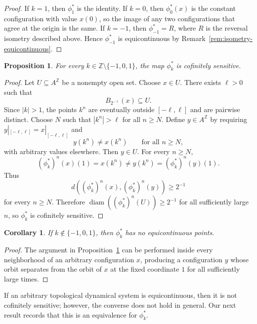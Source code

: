 \documentclass[12pt,a4paper]{article}
\newtheorem{proposition}[theorem]{Proposition}
\newtheorem{corollary}[theorem]{Corollary}
\theoremstyle{definition}
\theoremstyle{remark}
\newcommand{\ZZ}{\mathbb{Z}}
\newcommand{\diam}{\operatorname{diam}}
\begin{document}
\begin{proof}
If $k=1$, then $\phi_1^*$ is the identity. If $k=0$, then $\phi_0^*(x)$ is the constant configuration with value $x(0)$, so the image of any two configurations that agree at the origin is the same. If $k=-1$, then $\phi_{-1}^*=R$, where $R$ is the reversal isometry described above. Hence $\phi_{-1}^*$ is equicontinuous by Remark~\ref{rem:isometry-equicontinuous}.
\end{proof}

\begin{proposition}\label{prop:phi-a-cofinite-sensitive}
For every $k\in\ZZ\setminus\{-1,0,1\}$, the map $\phi_k^*$ is cofinitely sensitive.
\end{proposition}

\begin{proof}
Let $U\subseteq A^\ZZ$ be a nonempty open set. Choose $x\in U$. There exists $\ell>0$ such that
\[
B_{2^{-\ell}}(x)\subseteq U.
\]
Since $|k|>1$, the points $k^n$ are eventually outside $[-\ell,\ell]$ and are pairwise distinct. Choose $N$ such that $|k^n|>\ell$ for all $n\geq N$. Define $y\in A^\ZZ$ by requiring $y|_{[-\ell,\ell]}=x|_{[-\ell,\ell]}$ and
\[
y(k^n)\neq x(k^n)\qquad\text{for all }n\geq N,
\]
with arbitrary values elsewhere. Then $y\in U$. For every $n\geq N$,
\[
(\phi_k^*)^n(x)(1)=x(k^n)\neq y(k^n)=(\phi_k^*)^n(y)(1).
\]
Thus
\[
d((\phi_k^*)^n(x),(\phi_k^*)^n(y))\geq 2^{-1}
\]
for every $n\geq N$. Therefore $\diam((\phi_k^*)^n(U))\geq 2^{-1}$ for all sufficiently large $n$, so $\phi_k^*$ is cofinitely sensitive.
\end{proof}

\begin{corollary}\label{cor:no-eq-points-Z}
If $k\notin\{-1,0,1\}$, then $\phi_k^*$ has no equicontinuous points.
\end{corollary}

\begin{proof}
The argument in Proposition~\ref{prop:phi-a-cofinite-sensitive} can be performed inside every neighborhood of an arbitrary configuration $x$, producing a configuration $y$ whose orbit separates from the orbit of $x$ at the fixed coordinate $1$ for all sufficiently large times.
\end{proof}

If an arbitrary topological dynamical system is equicontinuous, then it is not cofinitely sensitive; however, the converse does not hold in general. Our next result records that this is an equivalence for $\phi_k ^*$.
\end{document}
